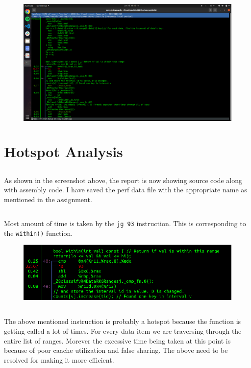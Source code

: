 \documentclass{article}
\begin{document}
\begin{figure}[H]
\centering
\includegraphics[width=1\textwidth]{images/2_5.png}
\end{figure}

\section{Hotspot Analysis}
\subsection{}
As shown in the screenshot above, the report is now showing source code along with assembly code. I have saved the perf data file with the appropriate name as mentioned in the assignment.

\subsection{}
Most amount of time is taken by the \texttt{jg 93} instruction. This is corresponding to the \texttt{within()} function.
\begin{figure}[H]
\centering  
\includegraphics[width=1\textwidth]{images/hotspot.png}
\end{figure}

\subsection{}
The above mentioned instruction is probably a hotspot because the function is getting called a lot of times. For every data item we are traversing through the entire list of ranges. Morever the excessive time being taken at this point is because of poor caache utilization and false sharing. The above need to be resolved for making it more efficient.
\end{document}
